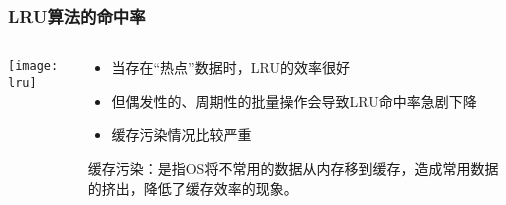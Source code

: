 % 			
% 		
% 			
% 
% 			
% 		
% 		
% 
% 
\begin{frame}[plain]
	\frametitle{LRU算法的命中率}
	\begin{columns}
		\begin{column}{.4\textwidth}
			\centering
			\texttt{[image: lru]}
		\end{column}
		
		\begin{column}{.6\textwidth}
			
				\begin{itemize}\large
					
					\item 当存在“热点”数据时，LRU的效率很好
					\item 但偶发性的、周期性的批量操作会导致LRU命中率急剧下降
					\item 缓存污染情况比较严重
					
				\end{itemize}
			\small
			缓存污染：是指OS将不常用的数据从内存移到缓存，造成常用数据的挤出，降低了缓存效率的现象。
		\end{column}
		
		
	\end{columns}
\end{frame}


